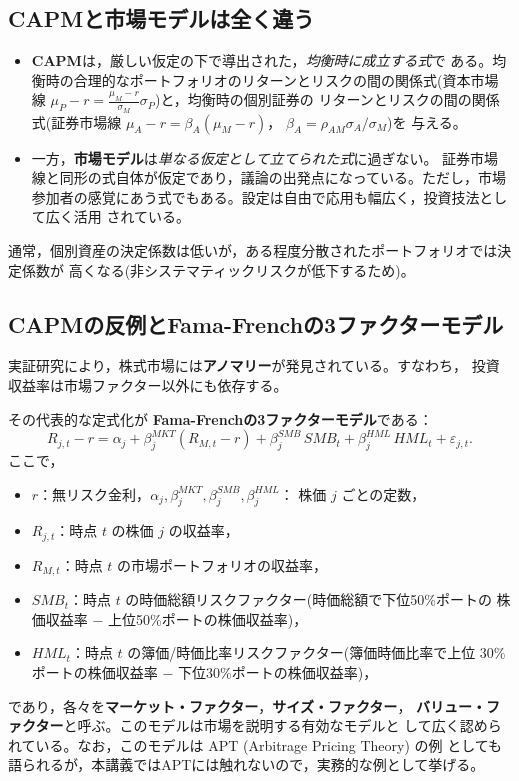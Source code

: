 \subsection{CAPMと市場モデルは全く違う}

\begin{keypoint}[CAPMと市場モデルの違い]
\begin{itemize}
\item \textbf{CAPM}は，厳しい仮定の下で導出された，\emph{均衡時に成立する式}で
ある。均衡時の合理的なポートフォリオのリターンとリスクの間の関係式(資本市場線
$\mu_P - r = \frac{\mu_M - r}{\sigma_M}\sigma_P$)と，均衡時の個別証券の
リターンとリスクの間の関係式(証券市場線
$\mu_A - r = \beta_A(\mu_M - r)$， $\beta_A = \rho_{AM}\sigma_A/\sigma_M$)を
与える。
\item 一方，\textbf{市場モデル}は\emph{単なる仮定として立てられた式}に過ぎない。
証券市場線と同形の式自体が仮定であり，議論の出発点になっている。ただし，市場
参加者の感覚にあう式でもある。設定は自由で応用も幅広く，投資技法として広く活用
されている。
\end{itemize}
通常，個別資産の決定係数は低いが，ある程度分散されたポートフォリオでは決定係数が
高くなる(非システマティックリスクが低下するため)。
\end{keypoint}

\subsection{CAPMの反例とFama-Frenchの3ファクターモデル}

実証研究により，株式市場には\textbf{アノマリー}が発見されている。すなわち，
投資収益率は市場ファクター以外にも依存する。

その代表的な定式化が \textbf{Fama-Frenchの3ファクターモデル}である：
\begin{equation}
R_{j,t} - r = \alpha_j + \beta_j^{MKT}(R_{M,t} - r)
+ \beta_j^{SMB}\,SMB_t + \beta_j^{HML}\,HML_t + \varepsilon_{j,t}.
\end{equation}
ここで，
\begin{itemize}
\item $r$：無リスク金利，$\alpha_j,\beta_j^{MKT},\beta_j^{SMB},\beta_j^{HML}$：
株価 $j$ ごとの定数，
\item $R_{j,t}$：時点 $t$ の株価 $j$ の収益率，
\item $R_{M,t}$：時点 $t$ の市場ポートフォリオの収益率，
\item $SMB_t$：時点 $t$ の時価総額リスクファクター(時価総額で下位50\%ポートの
株価収益率 $-$ 上位50\%ポートの株価収益率)，
\item $HML_t$：時点 $t$ の簿価/時価比率リスクファクター(簿価時価比率で上位
30\%ポートの株価収益率 $-$ 下位30\%ポートの株価収益率)，
\end{itemize}
であり，各々を\textbf{マーケット・ファクター}，\textbf{サイズ・ファクター}，
\textbf{バリュー・ファクター}と呼ぶ。このモデルは市場を説明する有効なモデルと
して広く認められている。なお，このモデルは APT (Arbitrage Pricing Theory) の例
としても語られるが，本講義ではAPTには触れないので，実務的な例として挙げる。

